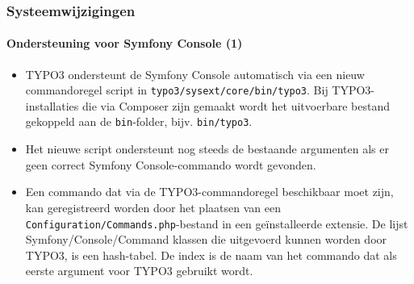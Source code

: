 \begin{frame}[fragile]
	\frametitle{Systeemwijzigingen}
	\framesubtitle{Ondersteuning voor Symfony Console (1)}

	\lstset{basicstyle=\tiny\ttfamily}

	\begin{itemize}

		\item TYPO3 ondersteunt de Symfony Console automatisch via een nieuw commandoregel
			script in \texttt{typo3/sysext/core/bin/typo3}.
			Bij TYPO3-installaties die via Composer zijn gemaakt wordt het uitvoerbare bestand
			gekoppeld aan de \texttt{bin}-folder, bijv. \texttt{bin/typo3}.

		\item Het nieuwe script ondersteunt nog steeds de bestaande argumenten als er geen
			correct Symfony Console-commando wordt gevonden.

		\item Een commando dat via de TYPO3-commandoregel beschikbaar moet zijn, kan
		 	geregistreerd worden door het plaatsen van een \texttt{Configuration/Commands.php}-bestand
		 	in een geïnstalleerde extensie. De lijst Symfony/Console/Command klassen die uitgevoerd
		 	kunnen worden door TYPO3, is een hash-tabel. De index is de naam van het commando
		 	dat als eerste argument voor TYPO3 gebruikt wordt.

	\end{itemize}

\end{frame}

